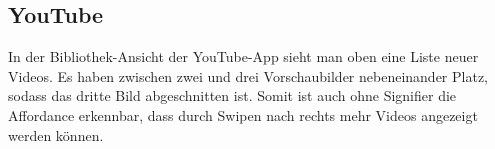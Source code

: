 \subsection*{YouTube}
In der Bibliothek-Ansicht der YouTube-App sieht man oben eine Liste neuer Videos. 
Es haben zwischen zwei und drei Vorschaubilder nebeneinander Platz, 
sodass das dritte Bild abgeschnitten ist. 
Somit ist auch ohne Signifier die Affordance erkennbar, 
dass durch Swipen nach rechts mehr Videos angezeigt werden können.

